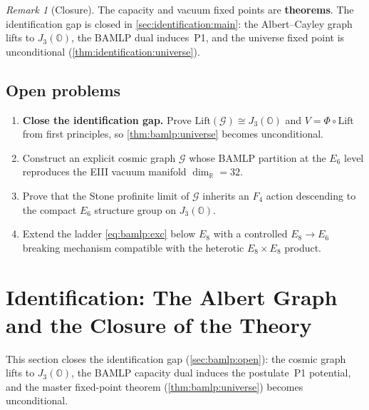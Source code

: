 \documentclass[11pt]{article}
\theoremstyle{plain}
\theoremstyle{definition}
\theoremstyle{remark}
\newtheorem{remark}[theorem]{Remark}
\begin{document}
\begin{remark}[Closure]\label{rem:bamlp:proved-vs-conj}
The capacity and vacuum fixed points are \textbf{theorems}. The identification
gap is closed in \autoref{sec:identification:main}: the Albert--Cayley graph
lifts to $J_3(\mathbb{O})$, the BAMLP dual induces~\textnormal{P1}, and the
universe fixed point is unconditional (\autoref{thm:identification:universe}).
\end{remark}

\subsection{Open problems}
\label{sec:bamlp:open}

\begin{enumerate}
  \item \textbf{Close the identification gap.} Prove
    $\mathrm{Lift}(\mathcal{G})\cong J_3(\mathbb{O})$ and $V=\Phi\circ\mathrm{Lift}$
    from first principles, so \autoref{thm:bamlp:universe} becomes unconditional.
  \item Construct an explicit cosmic graph $\mathcal{G}$ whose BAMLP partition
    at the $E_6$ level reproduces the EIII vacuum manifold
    $\dim_{\mathbb{R}}=32$.
  \item Prove that the Stone profinite limit of $\mathcal{G}$ inherits an
    $F_4$ action descending to the compact $E_6$ structure group on
    $J_3(\mathbb{O})$.
  \item Extend the ladder \eqref{eq:bamlp:exc} below $E_8$ with a controlled
    $E_8\to E_6$ breaking mechanism compatible with the heterotic
    $E_8\times E_8$ product.
\end{enumerate}%
\section{Identification: The Albert Graph and the Closure of the Theory}
\label{sec:identification:main}

This section closes the identification gap (\autoref{sec:bamlp:open}): the cosmic
graph lifts to $J_3(\mathbb{O})$, the BAMLP capacity dual induces the
postulate~\textnormal{P1} potential, and the master fixed-point theorem
(\autoref{thm:bamlp:universe}) becomes unconditional.
\end{document}
